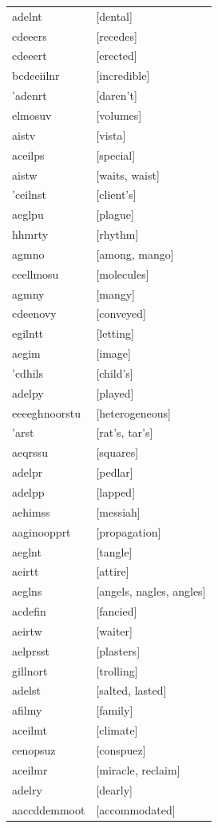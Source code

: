 \documentclass{article}
\begin{document}
\begin{tabular}{ll}
adelnt & [dental] \\
cdeeers & [recedes] \\
cdeeert & [erected] \\
bcdeeiilnr & [incredible] \\
'adenrt & [daren't] \\
elmosuv & [volumes] \\
aistv & [vista] \\
aceilps & [special] \\
aistw & [waits, waist] \\
'ceilnst & [client's] \\
aeglpu & [plague] \\
hhmrty & [rhythm] \\
agmno & [among, mango] \\
ceellmosu & [molecules] \\
agmny & [mangy] \\
cdeenovy & [conveyed] \\
egilntt & [letting] \\
aegim & [image] \\
'cdhils & [child's] \\
adelpy & [played] \\
eeeeghnoorstu & [heterogeneous] \\
'arst & [rat's, tar's] \\
aeqrssu & [squares] \\
adelpr & [pedlar] \\
adelpp & [lapped] \\
aehimss & [messiah] \\
aaginoopprt & [propagation] \\
aeglnt & [tangle] \\
aeirtt & [attire] \\
aeglns & [angels, nagles, angles] \\
acdefin & [fancied] \\
aeirtw & [waiter] \\
aelprsst & [plasters] \\
gillnort & [trolling] \\
adelst & [salted, lasted] \\
afilmy & [family] \\
aceilmt & [climate] \\
cenopsuz & [conspuez] \\
aceilmr & [miracle, reclaim] \\
adelry & [dearly] \\
aaccddemmoot & [accommodated] \\

\end{tabular}
\end{document}
